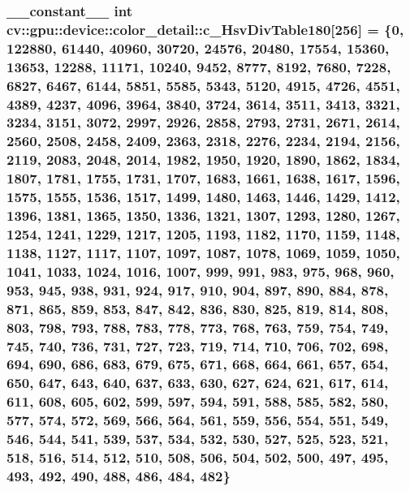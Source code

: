 \hypertarget{namespacecv_1_1gpu_1_1device_1_1color__detail_abd5c2e4a272bbff844c98d0fccdcb3fa}{
\subsubsection[{c\-\_\-\-Hsv\-Div\-Table180}]{\setlength{\rightskip}{0pt plus 5cm}\-\_\-\-\_\-constant\-\_\-\-\_\- int cv\-::gpu\-::device\-::color\-\_\-detail\-::c\-\_\-\-Hsv\-Div\-Table180\mbox{[}256\mbox{]} = \{0, 122880, 61440, 40960, 30720, 24576, 20480, 17554, 15360, 13653, 12288, 11171, 10240, 9452, 8777, 8192, 7680, 7228, 6827, 6467, 6144, 5851, 5585, 5343, 5120, 4915, 4726, 4551, 4389, 4237, 4096, 3964, 3840, 3724, 3614, 3511, 3413, 3321, 3234, 3151, 3072, 2997, 2926, 2858, 2793, 2731, 2671, 2614, 2560, 2508, 2458, 2409, 2363, 2318, 2276, 2234, 2194, 2156, 2119, 2083, 2048, 2014, 1982, 1950, 1920, 1890, 1862, 1834, 1807, 1781, 1755, 1731, 1707, 1683, 1661, 1638, 1617, 1596, 1575, 1555, 1536, 1517, 1499, 1480, 1463, 1446, 1429, 1412, 1396, 1381, 1365, 1350, 1336, 1321, 1307, 1293, 1280, 1267, 1254, 1241, 1229, 1217, 1205, 1193, 1182, 1170, 1159, 1148, 1138, 1127, 1117, 1107, 1097, 1087, 1078, 1069, 1059, 1050, 1041, 1033, 1024, 1016, 1007, 999, 991, 983, 975, 968, 960, 953, 945, 938, 931, 924, 917, 910, 904, 897, 890, 884, 878, 871, 865, 859, 853, 847, 842, 836, 830, 825, 819, 814, 808, 803, 798, 793, 788, 783, 778, 773, 768, 763, 759, 754, 749, 745, 740, 736, 731, 727, 723, 719, 714, 710, 706, 702, 698, 694, 690, 686, 683, 679, 675, 671, 668, 664, 661, 657, 654, 650, 647, 643, 640, 637, 633, 630, 627, 624, 621, 617, 614, 611, 608, 605, 602, 599, 597, 594, 591, 588, 585, 582, 580, 577, 574, 572, 569, 566, 564, 561, 559, 556, 554, 551, 549, 546, 544, 541, 539, 537, 534, 532, 530, 527, 525, 523, 521, 518, 516, 514, 512, 510, 508, 506, 504, 502, 500, 497, 495, 493, 492, 490, 488, 486, 484, 482\}}}\label{namespacecv_1_1gpu_1_1device_1_1color__detail_abd5c2e4a272bbff844c98d0fccdcb3fa}
